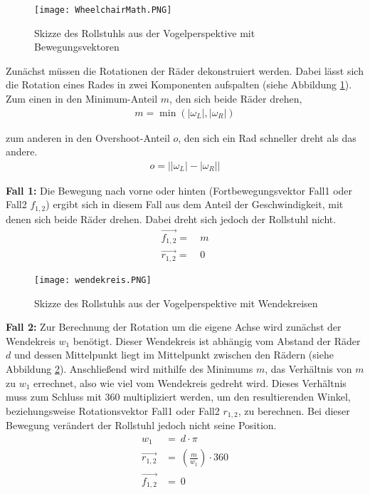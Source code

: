 \begin{figure}[h]
    \centering
    \texttt{[image: WheelchairMath.PNG]}
    \caption{Skizze des Rollstuhls aus der Vogelperspektive mit Bewegungsvektoren}
    \label{fig:wheelchairMath}
\end{figure}

Zunächst müssen die Rotationen der Räder dekonstruiert werden.
Dabei lässt sich die Rotation eines Rades in zwei Komponenten aufspalten (siehe Abbildung \ref{fig:wheelchairMath}).
Zum einen in den Minimum-Anteil $m$, den sich beide Räder drehen,
\begin{align}
    m = \min{(\left| \omega_L \right|,\left| \omega_R\right|)}
\end{align}

zum anderen in den Overshoot-Anteil $o$, den sich ein Rad schneller dreht als das andere.
\begin{align}
    o = \left|\left| \omega_L \right|-\left| \omega_R\right| \right|
\end{align}

\textbf{Fall 1:}
Die Bewegung nach vorne oder hinten (Fortbewegungsvektor Fall1 oder Fall2 $f_{1,2}$) ergibt sich in diesem Fall aus dem Anteil der Geschwindigkeit, mit denen sich beide Räder drehen.
Dabei dreht sich jedoch der Rollstuhl nicht.
\begin{align}
    \vec{f_{1,2}} = & \ m \\
    \vec{r_{1,2}} = & \ 0
\end{align}

\begin{figure}[h]
    \centering
    \texttt{[image: wendekreis.PNG]}
    \caption{Skizze des Rollstuhls aus der Vogelperspektive mit Wendekreisen}
    \label{fig:wendekreis}
\end{figure}

\textbf{Fall 2:}
Zur Berechnung der Rotation um die eigene Achse wird zunächst der Wendekreis $w_1$ benötigt.
Dieser Wendekreis ist abhängig vom Abstand der Räder $d$ und dessen Mittelpunkt liegt im Mittelpunkt zwischen den Rädern (siehe Abbildung \ref{fig:wendekreis}).
Anschließend wird mithilfe des Minimums $m$, das Verhältnis von $m$ zu $w_1$ errechnet, also wie viel vom Wendekreis gedreht wird.
Dieses Verhältnis muss zum Schluss mit $360$ multipliziert werden, um den resultierenden Winkel, beziehungsweise Rotationsvektor Fall1 oder Fall2 $r_{1,2}$, zu berechnen.
Bei dieser Bewegung verändert der Rollstuhl jedoch nicht seine Position.
\begin{align}
    w_1           & =            \ d \cdot \pi                  \\
    \vec{r_{1,2}} & =  \ \left(\frac {m} {w_1}\right) \cdot 360 \\
    \vec{f_{1,2}} & =  \ 0
\end{align}

